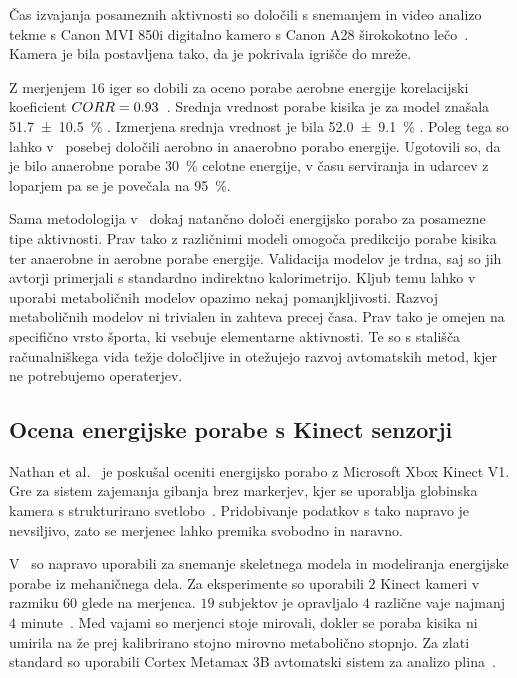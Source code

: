 Čas izvajanja posameznih aktivnosti so določili s snemanjem in video analizo tekme s Canon MVI 850i digitalno kamero s Canon A28 širokokotno lečo~\cite{botton2011energy}. Kamera je bila postavljena %
tako, da je pokrivala igrišče do mreže. 

Z merjenjem $16$ iger so dobili za oceno porabe aerobne energije korelacijski koeficient ${CORR} =\num{0.93}$~\cite{botton2011energy}. Srednja vrednost porabe kisika je za model znašala \SI{51.7 \pm 10.5}{\%} \vomax. Izmerjena srednja vrednost je bila \SI{52.0 \pm 9.1}{\%} \vomax. Poleg tega so lahko 
v~\cite{botton2011energy} posebej določili aerobno in anaerobno porabo energije. Ugotovili so, da je bilo anaerobne porabe \SI{30}{\%} celotne energije, v času serviranja in udarcev z loparjem pa se je povečala na \SI{95}{\%}.  

Sama metodologija v~\cite{botton2011energy} dokaj natančno določi energijsko porabo za posamezne tipe aktivnosti. Prav tako z različnimi modeli omogoča predikcijo porabe kisika ter anaerobne in aerobne porabe energije. Validacija modelov je trdna, saj so jih avtorji primerjali s standardno indirektno kalorimetrijo. Kljub temu lahko v uporabi metaboličnih modelov opazimo nekaj pomanjkljivosti. Razvoj metaboličnih modelov ni trivialen in zahteva precej časa. Prav tako je omejen na specifično vrsto športa, ki vsebuje elementarne aktivnosti. Te so s stališča računalniškega vida težje določljive in otežujejo razvoj avtomatskih metod, kjer ne potrebujemo operaterjev.




\subsection{Ocena energijske porabe s Kinect senzorji}

Nathan et al.~\cite{nathan2015estimating} je poskušal oceniti energijsko porabo z Microsoft Xbox Kinect V1. Gre za sistem zajemanja gibanja brez markerjev, kjer se uporablja globinska kamera s strukturirano svetlobo~\cite{nathan2015estimating}. Pridobivanje podatkov s tako napravo je nevsiljivo, zato se merjenec lahko premika svobodno in naravno. 

V~\cite{nathan2015estimating} so napravo uporabili za snemanje skeletnega modela in modeliranja energijske porabe iz mehaničnega dela. Za eksperimente so uporabili $2$ Kinect kameri v razmiku \SI{60}{\stopinj} glede na merjenca. $19$ subjektov je opravljalo $4$ različne vaje najmanj $4$ minute~\cite{nathan2015estimating}. Med vajami so merjenci stoje mirovali, dokler se poraba kisika ni umirila na že prej kalibrirano stojno mirovno metabolično stopnjo. Za zlati standard so uporabili Cortex Metamax 3B avtomatski sistem za analizo plina~\cite{nathan2015estimating}.

